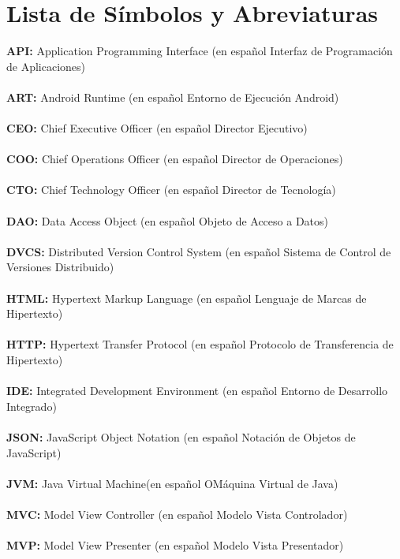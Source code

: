 \chapter*{Lista de Símbolos y Abreviaturas}%

\vspace{5 mm}
\noindent
\textbf{API:} Application Programming Interface (en español Interfaz de Programación de Aplicaciones)\\ \\
\textbf{ART:} Android Runtime (en español Entorno de Ejecución Android)\\ \\
\textbf{CEO:} Chief Executive Officer (en español Director Ejecutivo)\\ \\
\textbf{COO:} Chief Operations Officer (en español Director de Operaciones)\\ \\
\textbf{CTO:} Chief Technology Officer (en español Director de Tecnología)\\ \\
\textbf{DAO:} Data Access Object (en español Objeto de Acceso a Datos)\\ \\
\textbf{DVCS:} Distributed Version Control System (en español Sistema de Control de Versiones Distribuido)\\ \\
\textbf{HTML:} Hypertext Markup Language (en español Lenguaje de Marcas de Hipertexto)\\ \\
\textbf{HTTP:} Hypertext Transfer Protocol (en español Protocolo de Transferencia de Hipertexto)\\ \\
\textbf{IDE:} Integrated Development Environment (en español Entorno de Desarrollo Integrado)\\ \\
\textbf{JSON:} JavaScript Object Notation (en español Notación de Objetos de JavaScript)\\ \\
\textbf{JVM:} Java Virtual Machine(en español OMáquina Virtual de Java)\\ \\
\textbf{MVC:} Model View Controller (en español Modelo Vista Controlador)\\ \\
\textbf{MVP:} Model View Presenter (en español Modelo Vista Presentador)\\ \\
